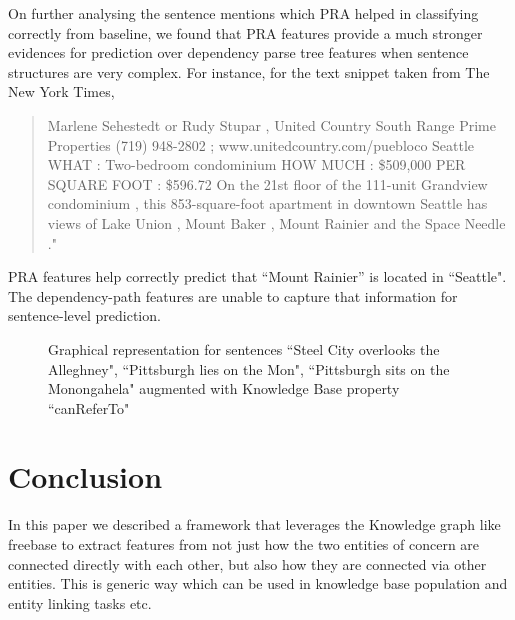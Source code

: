 \documentclass[11pt,a4paper]{article}
\begin{document}
On further analysing the sentence mentions which PRA helped in classifying
correctly from baseline, we found that PRA features provide a much stronger
evidences for prediction over dependency parse tree features when sentence
structures are very complex. For instance, for the text snippet taken from The
New York Times,

\begin{quote}
  Marlene Sehestedt or Rudy Stupar , United Country South Range Prime
  Properties (719) 948-2802 ; www.unitedcountry.com/puebloco Seattle WHAT :
  Two-bedroom condominium HOW MUCH : \$509,000 PER SQUARE FOOT : \$596.72 On
  the 21st floor of the 111-unit Grandview condominium , this 853-square-foot
  apartment in downtown Seattle has views of Lake Union , Mount Baker , Mount
  Rainier and the Space Needle ."
\end{quote}

PRA features help correctly predict that ``Mount Rainier'' is located in
``Seattle". The dependency-path features are unable to capture that information
for sentence-level prediction.

\begin{figure}
  \caption{Graphical representation for sentences ``Steel City overlooks the
    Alleghney", ``Pittsburgh lies on the Mon", ``Pittsburgh sits on the
    Monongahela" augmented with Knowledge Base property ``canReferTo"}
  \label{fig:M1}
\end{figure}

\section{Conclusion}

In this paper we described a framework that leverages the Knowledge graph like
freebase to extract features from not just how the two entities of concern are
connected directly with each other, but also how they are connected via other
entities. This is generic way which can be used in knowledge base population
and entity linking tasks etc.



\end{document}
